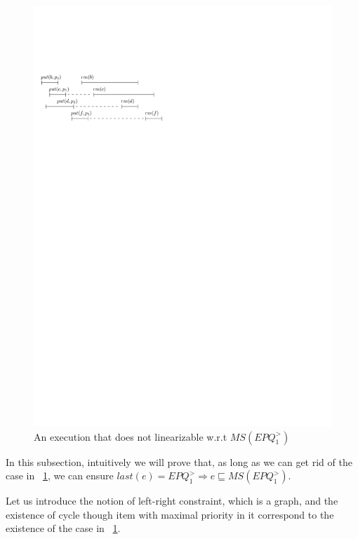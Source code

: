 \begin{figure}[htbp]
  \centering
  \includegraphics[width=0.6 \textwidth]{figures/PIC-HIS-INTRO-GAP-EPQ1L.pdf}
  \caption{An execution that does not linearizable w.r.t $\textit{MS}(\textit{EPQ}_1^{>})$}
  \label{fig:introduce gap for EPQ1Lar}
\end{figure}

In this subsection, intuitively we will prove that, as long as we can get rid of the case in \figurename~\ref{fig:introduce gap for EPQ1Lar}, we can ensure $\textit{last}(e) = \textit{EPQ}_1^{>} \Rightarrow e \sqsubseteq \textit{MS}(\textit{EPQ}_1^{>})$.

Let us introduce the notion of left-right constraint, which is a graph, and the existence of cycle though item with maximal priority in it correspond to the existence of the case in \figurename~\ref{fig:introduce gap for EPQ1Lar}.

